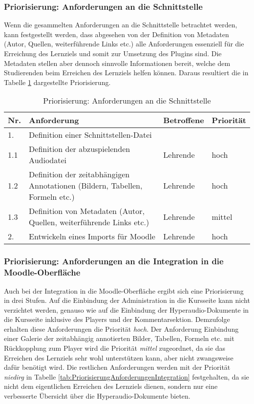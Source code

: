 \subsubsection{Priorisierung: Anforderungen an die Schnittstelle}
Wenn die gesammelten Anforderungen an die Schnittstelle betrachtet werden, kann festgestellt werden, dass abgesehen von der Definition von Metadaten (Autor, Quellen, weiterführende Links etc.) alle Anforderungen essenziell für die Erreichung des Lernziels und somit zur Umsetzung des Plugins sind. Die Metadaten stellen aber dennoch sinnvolle Informationen bereit, welche dem Studierenden beim Erreichen des Lernziels helfen können. Daraus resultiert die in Tabelle \ref{tab:PriorisierungAnforderungenSchnittstelle} dargestellte Priorisierung.

\begin{table}[!ht]
\def\arraystretch{1.4}
\caption{Priorisierung: Anforderungen an die Schnittstelle}
\label{tab:PriorisierungAnforderungenSchnittstelle}
 \begin{tabularx}{\textwidth}{lXll}      
    \hline
    Nr. & Anforderung & Betroffene & Priorität
    \\\hline
    1. & Definition einer Schnittstellen-Datei & & \\
    1.1 & Definition der abzuspielenden Audiodatei & Lehrende & hoch\\
    1.2 & Definition der zeitabhängigen Annotationen (Bildern, Tabellen, Formeln etc.) & Lehrende & hoch\\
    1.3 & Definition von Metadaten (Autor, Quellen, weiterführende Links etc.) & Lehrende & mittel\\
    2. & Entwickeln eines Imports für Moodle & Lehrende & hoch\\
    \hline
    \end{tabularx}
\end{table}

\subsubsection{Priorisierung: Anforderungen an die Integration in die Moodle-Oberfläche}
Auch bei der Integration in die Moodle-Oberfläche ergibt sich eine Priorisierung in drei Stufen. Auf die Einbindung der Administration in die Kursseite kann nicht verzichtet werden, genauso wie auf die Einbindung der Hyperaudio-Dokumente in die Kursseite inklusive des Players und der Kommentarsektion. Demzufolge erhalten diese Anforderungen die Priorität \textit{hoch}. Der Anforderung \glqq Einbindung einer Galerie der zeitabhängig annotierten Bilder, Tabellen, Formeln etc. mit Rückkopplung zum Player\grqq{} wird die Priorität \textit{mittel} zugeordnet, da sie das Erreichen des Lernziels sehr wohl unterstützen kann, aber nicht zwangsweise dafür benötigt wird. Die restlichen Anforderungen werden mit der Priorität \textit{niedirg} in Tabelle \ref{tab:PriorisierungAnforderungenIntegration} festgehalten, da sie nicht dem eigentlichen Erreichen des Lernziels dienen, sondern nur eine verbesserte Übersicht über die Hyperaudio-Dokumente bieten.

